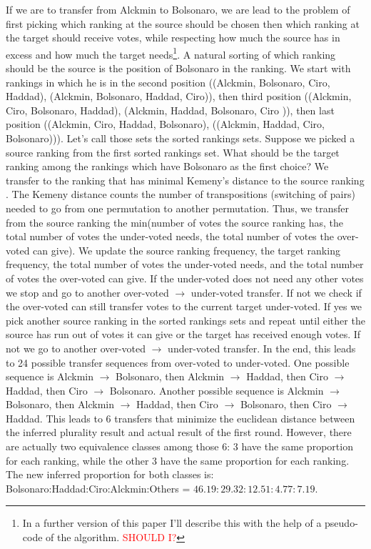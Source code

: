 \documentclass[hidelinks,11pt]{article}
\begin{document}
 If we are to transfer from Alckmin to Bolsonaro, we are lead to the problem of first
picking which ranking at the source should be chosen then which ranking at the
target should receive votes, while respecting how much the source has in excess
and how much the target needs\footnote{In a further version of this paper
  I'll describe this with the help of a pseudo-code of the algorithm. \textcolor{red}{SHOULD I?}}. A
natural sorting of which ranking should be the source is the position of
Bolsonaro in the ranking. We start with rankings in which he is in the second
position ((Alckmin, Bolsonaro, Ciro, Haddad), (Alckmin, Bolsonaro, Haddad,
Ciro)), then third position ((Alckmin, Ciro, Bolsonaro, Haddad), (Alckmin,
Haddad, Bolsonaro, Ciro )), then last position ((Alckmin, Ciro, Haddad,
Bolsonaro), ((Alckmin, Haddad, Ciro, Bolsonaro))). Let's call those sets the
sorted rankings sets. Suppose we picked a source ranking from the first sorted
rankings set. What should be the target ranking among the rankings which have
Bolsonaro as the first choice? We transfer to the ranking that has minimal
Kemeny's distance to the source ranking \parencite{nurmi2002voting}. The Kemeny
distance counts the number of transpositions (switching of pairs) needed to go
from one permutation to another permutation. Thus, we transfer from the source
ranking the min(number of votes the source ranking has, the total number of
votes the under-voted needs, the total number of votes the over-voted can give).
We update the source ranking frequency, the target ranking frequency, the total
number of votes the under-voted needs, and the total number of votes the
over-voted can give. If the under-voted does not need any other votes we stop and
go to another over-voted \(\to\) under-voted transfer. If not we check if the
over-voted can still transfer votes to the current target under-voted. If yes we
pick another source ranking in the sorted rankings sets and repeat until either
the source has run out of votes it can give or the target has received enough
votes. If not we go to another over-voted \(\to\) under-voted transfer. In the end, this leads to 24 possible transfer sequences from over-voted
to under-voted. One possible sequence is Alckmin \(\to\) Bolsonaro, then Alckmin
\(\to\) Haddad, then Ciro \(\to\) Haddad, then Ciro \(\to\) Bolsonaro. Another
possible sequence is  Alckmin \(\to\) Bolsonaro, then Alckmin \(\to\) Haddad, then
Ciro \(\to\) Bolsonaro, then Ciro \(\to\) Haddad. This leads to 6 transfers that
minimize the euclidean distance between the inferred plurality result and actual
result of the first round. However, there are actually two equivalence classes
among those 6: 3 have the same proportion for each ranking, while the other 3
have the same proportion for each ranking. The new inferred proportion for both
classes is: Bolsonaro:Haddad:Ciro:Alckmin:Others =
\(46.19:29.32:12.51:4.77:7.19 \).
\end{document}
